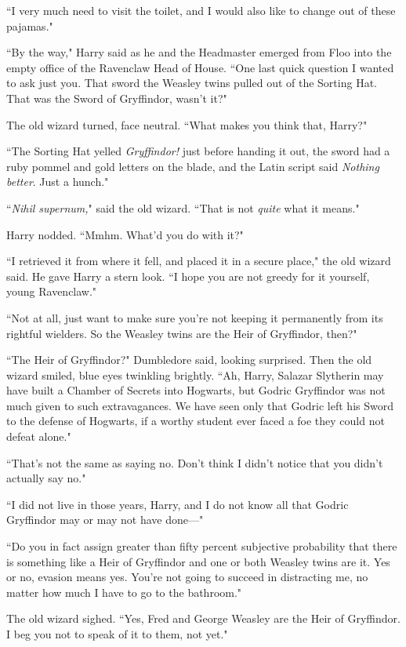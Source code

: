 ``I very much need to visit the toilet, and I would also like to change out of these pajamas."

\later

``By the way," Harry said as he and the Headmaster emerged from Floo into the empty office of the Ravenclaw Head of House. ``One last quick question I wanted to ask just you. That sword the Weasley twins pulled out of the Sorting Hat. That was the Sword of Gryffindor, wasn't it?"

The old wizard turned, face neutral. ``What makes you think that, Harry?"

``The Sorting Hat yelled \emph{Gryffindor!} just before handing it out, the sword had a ruby pommel and gold letters on the blade, and the Latin script said \emph{Nothing better}. Just a hunch."

``\emph{Nihil supernum,}" said the old wizard. ``That is not \emph{quite} what it means."

Harry nodded. ``Mmhm. What'd you do with it?"

``I retrieved it from where it fell, and placed it in a secure place," the old wizard said. He gave Harry a stern look. ``I hope you are not greedy for it yourself, young Ravenclaw."

``Not at all, just want to make sure you're not keeping it permanently from its rightful wielders. So the Weasley twins are the Heir of Gryffindor, then?"

``The Heir of Gryffindor?" Dumbledore said, looking surprised. Then the old wizard smiled, blue eyes twinkling brightly. ``Ah, Harry, Salazar Slytherin may have built a Chamber of Secrets into Hogwarts, but Godric Gryffindor was not much given to such extravagances. We have seen only that Godric left his Sword to the defense of Hogwarts, if a worthy student ever faced a foe they could not defeat alone."

``That's not the same as saying no. Don't think I didn't notice that you didn't actually say no."

``I did not live in those years, Harry, and I do not know all that Godric Gryffindor may or may not have done—"

``Do you in fact assign greater than fifty percent subjective probability that there is something like a Heir of Gryffindor and one or both Weasley twins are it. Yes or no, evasion means yes. You're not going to succeed in distracting me, no matter how much I have to go to the bathroom."

The old wizard sighed. ``Yes, Fred and George Weasley are the Heir of Gryffindor. I beg you not to speak of it to them, not yet."

